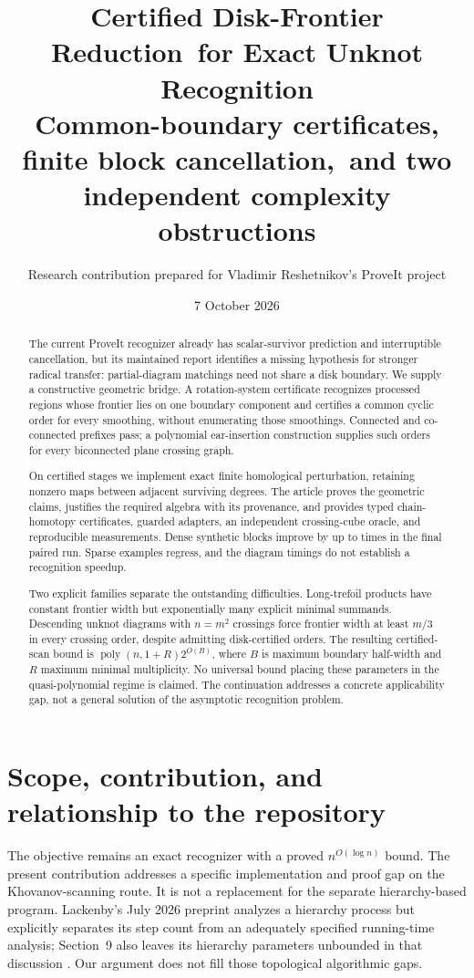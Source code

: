 \documentclass[11pt]{article}
\title{Certified Disk-Frontier Reduction\ for Exact Unknot Recognition\\[5pt]
\large Common-boundary certificates, finite block cancellation,\ and two independent complexity obstructions}
\author{Research contribution prepared for Vladimir Reshetnikov's ProveIt project}
\date{7 October 2026}
\theoremstyle{definition}\newtheorem{definition}[theorem]{Definition}
\theoremstyle{remark}\newtheorem{remark}[theorem]{Remark}
\begin{document}
\maketitle
\begin{abstract}
The current ProveIt recognizer already has scalar-survivor prediction and
interruptible cancellation, but its maintained report identifies a missing
hypothesis for stronger radical transfer: partial-diagram matchings need not
share a disk boundary. We supply a constructive geometric bridge. A
rotation-system certificate recognizes processed regions whose frontier lies on
one boundary component and certifies a common cyclic order for every smoothing,
without enumerating those smoothings. Connected and co-connected prefixes pass;
a polynomial ear-insertion construction supplies such orders for every
biconnected plane crossing graph.

On certified stages we implement exact finite homological perturbation,
retaining nonzero maps between adjacent surviving degrees. The article proves
the geometric claims, justifies the required algebra with its provenance, and
provides typed chain-homotopy certificates, guarded adapters, an independent
crossing-cube oracle, and reproducible measurements. Dense synthetic blocks
improve by up to \DenseSpeedup{} times in the final paired run. Sparse examples
regress, and the diagram timings do not establish a recognition speedup.

Two explicit families separate the outstanding difficulties. Long-trefoil
products have constant frontier width but exponentially many explicit minimal
summands. Descending unknot diagrams with $n=m^2$ crossings force frontier width
at least $m/3$ in every crossing order, despite admitting disk-certified orders.
The resulting certified-scan bound is $\operatorname{poly}(n,1+R)2^{O(B)}$,
where $B$ is maximum boundary half-width and $R$ maximum minimal multiplicity.
No universal bound placing these parameters in the quasi-polynomial regime is
claimed. The continuation addresses a concrete applicability gap, not a general
solution of the asymptotic recognition problem.
\end{abstract}
\clearpage
{\small\setlength{\parskip}{0pt}\tableofcontents}
\newpage

\section{Scope, contribution, and relationship to the repository}
\label{sec:scope}
The objective remains an exact recognizer with a proved $n^{O(\log n)}$ bound.
The present contribution addresses a specific implementation and proof gap on the
Khovanov-scanning route. It is not a replacement for the separate hierarchy-based
program. Lackenby's July 2026 preprint analyzes a hierarchy process but explicitly
separates its step count from an adequately specified running-time analysis;
Section~9 also leaves its hierarchy parameters unbounded in that discussion
\cite{Lackenby2026}. Our argument does not fill those topological algorithmic gaps.
\end{document}
